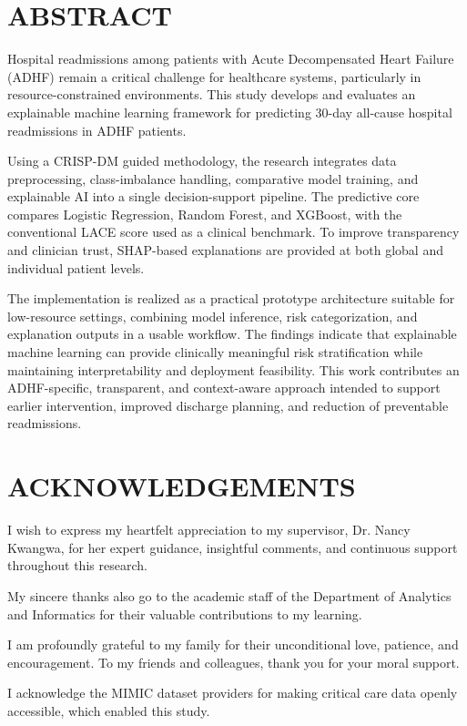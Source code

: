 \documentclass[12pt,a4paper]{report}
\begin{document}
\chapter*{ABSTRACT}
Hospital readmissions among patients with Acute Decompensated Heart Failure (ADHF) remain a critical challenge for healthcare systems, particularly in resource-constrained environments. This study develops and evaluates an explainable machine learning framework for predicting 30-day all-cause hospital readmissions in ADHF patients.

Using a CRISP-DM guided methodology, the research integrates data preprocessing, class-imbalance handling, comparative model training, and explainable AI into a single decision-support pipeline. The predictive core compares Logistic Regression, Random Forest, and XGBoost, with the conventional LACE score used as a clinical benchmark. To improve transparency and clinician trust, SHAP-based explanations are provided at both global and individual patient levels.

The implementation is realized as a practical prototype architecture suitable for low-resource settings, combining model inference, risk categorization, and explanation outputs in a usable workflow. The findings indicate that explainable machine learning can provide clinically meaningful risk stratification while maintaining interpretability and deployment feasibility. This work contributes an ADHF-specific, transparent, and context-aware approach intended to support earlier intervention, improved discharge planning, and reduction of preventable readmissions.

\chapter*{ACKNOWLEDGEMENTS}
I wish to express my heartfelt appreciation to my supervisor, Dr. Nancy Kwangwa, for her expert guidance, insightful comments, and continuous support throughout this research.

My sincere thanks also go to the academic staff of the Department of Analytics and Informatics for their valuable contributions to my learning.

I am profoundly grateful to my family for their unconditional love, patience, and encouragement. To my friends and colleagues, thank you for your moral support.

I acknowledge the MIMIC dataset providers for making critical care data openly accessible, which enabled this study.
\end{document}
